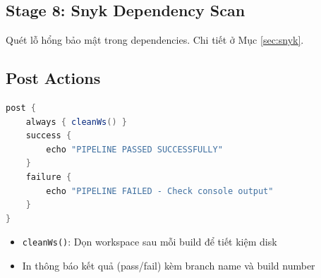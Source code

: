 \subsection{Stage 8: Snyk Dependency Scan}
Quét lỗ hổng bảo mật trong dependencies. Chi tiết ở Mục \ref{sec:snyk}.

\subsection{Post Actions}
\begin{lstlisting}[language=java, caption={Post-build actions}]
post {
    always { cleanWs() }
    success {
        echo "PIPELINE PASSED SUCCESSFULLY"
    }
    failure {
        echo "PIPELINE FAILED - Check console output"
    }
}
\end{lstlisting}

\begin{itemize}[noitemsep]
    \item \texttt{cleanWs()}: Dọn workspace sau mỗi build để tiết kiệm disk
    \item In thông báo kết quả (pass/fail) kèm branch name và build number
\end{itemize}
